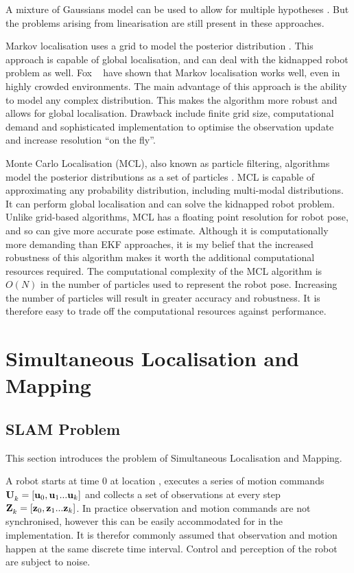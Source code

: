 A mixture of Gaussians model can be used to allow for multiple
hypotheses \cite{JensfeltKristensen01,Cox94}. But the problems arising
from linearisation are still present in these approaches.

Markov localisation uses a grid to model the posterior distribution
\cite{Fox99}. This approach is capable of global localisation, and can
deal with the kidnapped robot problem as well. Fox \etal\ \cite{fb99}
have shown that Markov localisation works well, even in highly crowded
environments. The main advantage of this approach is the ability to
model any complex distribution. This makes the algorithm more robust
and allows for global localisation. Drawback include finite grid size,
computational demand and sophisticated implementation to optimise the
observation update and increase resolution ``on the fly''.

Monte Carlo Localisation (MCL), also known as particle filtering,
algorithms model the posterior distributions as a set of particles
\cite{Thrun00j, JensfeltAustinWijk00b}. MCL is capable of
approximating any probability distribution, including multi-modal
distributions. It can perform global localisation and can solve the
kidnapped robot problem. Unlike grid-based algorithms, MCL has a
floating point resolution for robot pose, and so can give more
accurate pose estimate. Although it is computationally more demanding
than EKF approaches, it is my belief that the increased robustness of
this algorithm makes it worth the additional computational resources
required. The computational complexity of the MCL algorithm is $O(N)$
in the number of particles used to represent the robot
pose. Increasing the number of particles will result in greater
accuracy and robustness. It is therefore easy to trade off the
computational resources against performance.

\section{Simultaneous Localisation and Mapping}
\label{sec:SLAM}

\subsection{SLAM Problem}

This section introduces the problem of Simultaneous Localisation and
Mapping.

A robot starts at time 0 at location , executes a series of
motion commands ${\bf U}^{}_{k} = [{\bf u}_{0},{\bf u}_{1}...{\bf u}_{k}]$ and collects a
set of observations at every step
${\bf Z}^{}_{k}=[{\bf z}_{0},{\bf z}_{1}...{\bf z}_{k}]$. In practice observation and motion
commands are not synchronised, however this can be easily accommodated
for in the implementation. It is therefor commonly assumed that
observation and motion happen at the same discrete time interval.
Control and perception of the robot are subject to noise.


